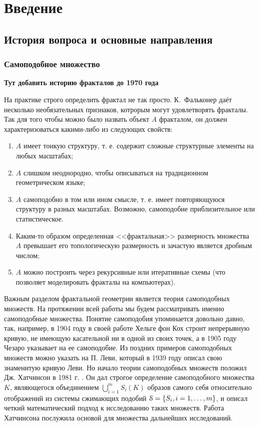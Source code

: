 \chapter*{Введение}                         %


\section{История вопроса и основные направления}


\subsection{Самоподобное множество}

{\bf Тут добавить историю фракталов до 1970 года}

На практике строго определить фрактал не так просто.
К.~Фальконер \cite{Falconer2004} даёт несколько необязательных признаков, котрорым могут удовлетворять фракталы.
Так для того чтобы можно было назвать объект $A$ фракталом, он должен характеризоваться какими-либо из следующих свойств:

\begin{enumerate}
\item $A$ имеет тонкую структуру, т. е. содержит сложные структурные элементы на любых масштабах;
\item $A$ слишком неоднородно, чтобы описываться на традиционном геометрическом языке;
\item $A$ самоподобно в том или ином смысле, т. е. имеет повторяющуюся структуру в разных масштабах. Возможно, самоподобие приблизительное или статистическое.
\item Каким-то образом определенная <<фрактальная>> размерность множества $A$ превышает его топологическую размерность и зачастую является дробным числом;
\item $A$ можно построить через рекурсивные или итеративные схемы (что позволяет моделировать фракталы на компьютерах).
\end{enumerate}


Важным разделом фрактальной геометрии является теория самоподобных множеств.
На протяжении всей работы мы будем рассматривать именно самоподобные множества.
Понятие самоподобия упоминается довольно давно, так, например, в 1904 году в своей работе \cite{Koch} Хельге фон Кох строит  непрерывную кривую, не имеющую касательной ни в одной из своих точек, а в 1905 году Чезаро \cite{Ces} указывает на ее самоподобие.
Из поздних примеров самоподобных множеств можно указать на П. Леви, который в 1939 году \cite{Levy1939} описал свою знаменитую кривую Леви.
Но начало теории самоподобных множеств положил Дж. Хатчинсон в 1981 г. \cite{Hut1981}.
Он дал строгое определение самоподобного множества $K$, являющегося объединением $\bigcup_{i=1}^mS_i(K)$ образов самого себя относительно отображений из системы сжимающих подобий ${\EuScript S}=\{S_i, i=1,\ldots,m\}$, и описал четкий математический подход к исследованию таких множеств. 
Работа Хатчинсона послужила основой для множества дальнейших исследований.

